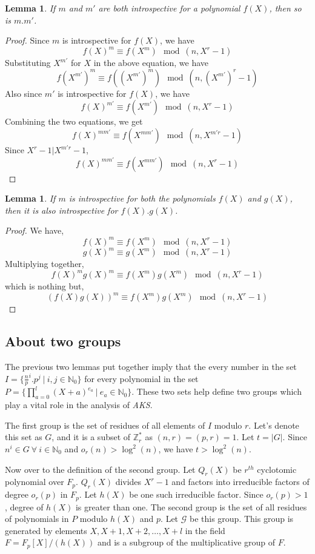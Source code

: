 \documentclass[11pt]{article}
\newtheorem{lemma}[theorem]{Lemma}
\begin{document}
\begin{lemma}
\label{lemma:IntrospectiveLemma1}
If $m$ and $m'$ are both introspective for a polynomial $f(X)$, then so is $m . m'$.
\end{lemma}
\begin{proof}
Since $m$ is introspective for $f(X)$, we have
\[f(X)^m \equiv f(X^m) \mod (n, X^r-1)\]
Substituting $X^{m'}$ for $X$ in the above equation, we have
\[f(X^{m'})^m \equiv f((X^{m'})^m) \mod (n, (X^{m'})^r-1)\]
Also since $m'$ is introspective for $f(X)$, we have
\[f(X)^{m'} \equiv f(X^{m'}) \mod (n, X^r-1)\]
Combining the two equations, we get
\[f(X)^{mm'} \equiv f(X^{mm'}) \mod (n, X^{m'r}-1)\]
Since $X^{r}-1 | X^{m'r}-1$,
\[f(X)^{mm'} \equiv f(X^{mm'}) \mod (n, X^r-1)\]
\end{proof}
\begin{lemma}
\label{lemma:IntrospectiveLemma2}
If $m$ is introspective for both the polynomials $f(X)$ and $g(X)$, then it is also introspective for $f(X) . g(X)$.
\end{lemma}
\begin{proof}
We have,
\[f(X)^m \equiv f(X^m) \mod (n, X^r-1)\]
\[g(X)^m \equiv g(X^m) \mod (n, X^r-1)\]
Multiplying together,
\[f(X)^mg(X)^m \equiv f(X^m)g(X^m) \mod (n, X^r-1)\]
which is nothing but,
\[(f(X)g(X))^m \equiv f(X^m)g(X^m) \mod (n, X^r-1)\]
\end{proof}

\subsection{About two groups}
The previous two lemmas put together imply that the every number in the set $I = \{\frac{n}{p}^i.p^j\ |\ i,j \in \mathbb{N}_0\}$ for every polynomial in the set $P = \{\prod_{a=0}^{l}{(X+a)^{e_a}}\ |\ e_a \in \mathbb{N}_0\}$. These two sets help define two groups which play a vital role in the analysis of \emph{AKS}.

The first group is the set of residues of all elements of $I$ modulo $r$. Let's denote this set as $G$, and it is a subset of $\mathbb{Z}_r^*$ as $(n,r) = (p,r) = 1$. Let $t = |G|$. Since $n^i \in G \ \forall \ i \in \mathbb{N}_0$ and $o_r(n) > \log^2(n)$, we have $t > \log^2(n)$.

Now over to the definition of the second group. Let $Q_r(X)$ be $r^{th}$ cyclotomic polynomial over $F_p$. $Q_r(X)$ divides $X^r-1$ and factors into irreducible factors of degree $o_r(p)$ in $F_p$. Let $h(X)$ be one such irreducible factor. Since $o_r(p) > 1$, degree of $h(X)$ is greater than one. The second group is the set of all residues of polynomials in $P$ modulo $h(X)$ and $p$. Let $\mathcal{G}$ be this group. This group is generated by elements $X, X + 1, X + 2, \dots, X + l$ in the field $F = F_p[X]/(h(X))$ and is a subgroup of the multiplicative group of $F$.
\end{document}
